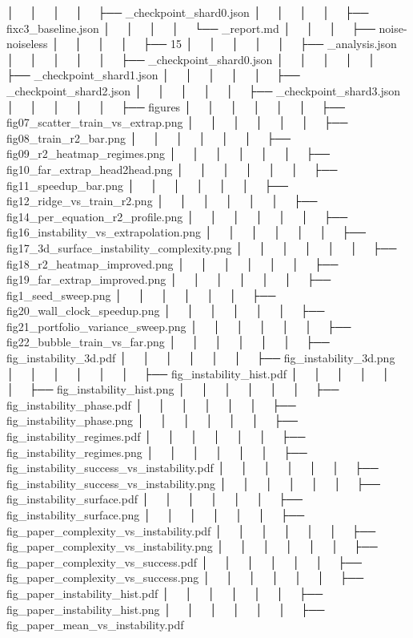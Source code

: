 │   │       │   │       ├── _checkpoint_shard0.json
│   │       │   │       ├── fixc3_baseline.json
│   │       │   │       └── _report.md
│   │       │   ├── noise-noiseless
│   │       │   │   ├── 15
│   │       │   │   │   ├── _analysis.json
│   │       │   │   │   ├── _checkpoint_shard0.json
│   │       │   │   │   ├── _checkpoint_shard1.json
│   │       │   │   │   ├── _checkpoint_shard2.json
│   │       │   │   │   ├── _checkpoint_shard3.json
│   │       │   │   │   ├── figures
│   │       │   │   │   │   ├── fig07_scatter_train_vs_extrap.png
│   │       │   │   │   │   ├── fig08_train_r2_bar.png
│   │       │   │   │   │   ├── fig09_r2_heatmap_regimes.png
│   │       │   │   │   │   ├── fig10_far_extrap_head2head.png
│   │       │   │   │   │   ├── fig11_speedup_bar.png
│   │       │   │   │   │   ├── fig12_ridge_vs_train_r2.png
│   │       │   │   │   │   ├── fig14_per_equation_r2_profile.png
│   │       │   │   │   │   ├── fig16_instability_vs_extrapolation.png
│   │       │   │   │   │   ├── fig17_3d_surface_instability_complexity.png
│   │       │   │   │   │   ├── fig18_r2_heatmap_improved.png
│   │       │   │   │   │   ├── fig19_far_extrap_improved.png
│   │       │   │   │   │   ├── fig1_seed_sweep.png
│   │       │   │   │   │   ├── fig20_wall_clock_speedup.png
│   │       │   │   │   │   ├── fig21_portfolio_variance_sweep.png
│   │       │   │   │   │   ├── fig22_bubble_train_vs_far.png
│   │       │   │   │   │   ├── fig_instability_3d.pdf
│   │       │   │   │   │   ├── fig_instability_3d.png
│   │       │   │   │   │   ├── fig_instability_hist.pdf
│   │       │   │   │   │   ├── fig_instability_hist.png
│   │       │   │   │   │   ├── fig_instability_phase.pdf
│   │       │   │   │   │   ├── fig_instability_phase.png
│   │       │   │   │   │   ├── fig_instability_regimes.pdf
│   │       │   │   │   │   ├── fig_instability_regimes.png
│   │       │   │   │   │   ├── fig_instability_success_vs_instability.pdf
│   │       │   │   │   │   ├── fig_instability_success_vs_instability.png
│   │       │   │   │   │   ├── fig_instability_surface.pdf
│   │       │   │   │   │   ├── fig_instability_surface.png
│   │       │   │   │   │   ├── fig_paper_complexity_vs_instability.pdf
│   │       │   │   │   │   ├── fig_paper_complexity_vs_instability.png
│   │       │   │   │   │   ├── fig_paper_complexity_vs_success.pdf
│   │       │   │   │   │   ├── fig_paper_complexity_vs_success.png
│   │       │   │   │   │   ├── fig_paper_instability_hist.pdf
│   │       │   │   │   │   ├── fig_paper_instability_hist.png
│   │       │   │   │   │   ├── fig_paper_mean_vs_instability.pdf
